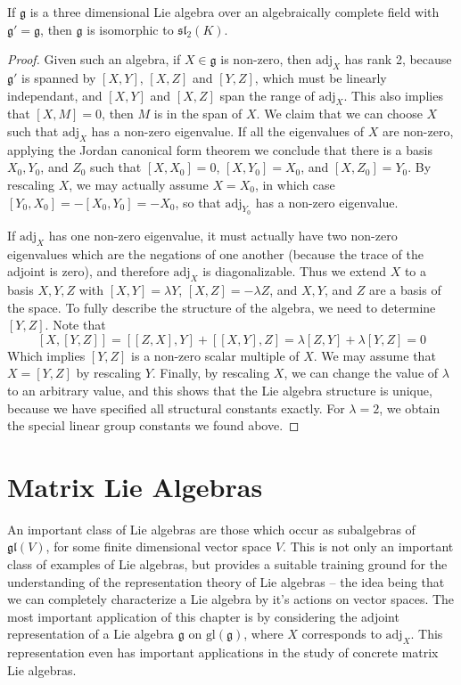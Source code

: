 \begin{theorem}
    If $\mathfrak{g}$ is a three dimensional Lie algebra over an algebraically complete field with $\mathfrak{g}' = \mathfrak{g}$, then $\mathfrak{g}$ is isomorphic to $\mathfrak{sl}_2(K)$.
\end{theorem}
\begin{proof}
Given such an algebra, if $X \in \mathfrak{g}$ is non-zero, then $\text{adj}_X$ has rank 2, because $\mathfrak{g}'$ is spanned by $[X,Y]$, $[X,Z]$ and $[Y,Z]$, which must be linearly independant, and $[X,Y]$ and $[X,Z]$ span the range of $\text{adj}_X$. This also implies that $[X,M] = 0$, then $M$ is in the span of $X$. We claim that we can choose $X$ such that $\text{adj}_X$ has a non-zero eigenvalue. If all the eigenvalues of $X$ are non-zero, applying the Jordan canonical form theorem we conclude that there is a basis $X_0, Y_0$, and $Z_0$ such that $[X,X_0] = 0$, $[X,Y_0] = X_0$, and $[X,Z_0] = Y_0$. By rescaling $X$, we may actually assume $X = X_0$, in which case $[Y_0,X_0] = -[X_0,Y_0] = -X_0$, so that $\text{adj}_{Y_0}$ has a non-zero eigenvalue.

If $\text{adj}_X$ has one non-zero eigenvalue, it must actually have two non-zero eigenvalues which are the negations of one another (because the trace of the adjoint is zero), and therefore $\text{adj}_X$ is diagonalizable. Thus we extend $X$ to a basis $X,Y,Z$ with $[X,Y] = \lambda Y$, $[X,Z] = -\lambda Z$, and $X,Y$, and $Z$ are a basis of the space. To fully describe the structure of the algebra, we need to determine $[Y,Z]$. Note that
%
\[ [X,[Y,Z]] = [[Z,X],Y] + [[X,Y],Z] = \lambda [Z,Y] + \lambda [Y,Z] = 0 \]
%
Which implies $[Y,Z]$ is a non-zero scalar multiple of $X$. We may assume that $X = [Y,Z]$ by rescaling $Y$. Finally, by rescaling $X$, we can change the value of $\lambda$ to an arbitrary value, and this shows that the Lie algebra structure is unique, because we have specified all structural constants exactly. For $\lambda = 2$, we obtain the special linear group constants we found above.
\end{proof}










\chapter{Matrix Lie Algebras}

An important class of Lie algebras are those which occur as subalgebras of $\mathfrak{gl}(V)$, for some finite dimensional vector space $V$. This is not only an important class of examples of Lie algebras, but provides a suitable training ground for the understanding of the representation theory of Lie algebras -- the idea being that we can completely characterize a Lie algebra by it's actions on vector spaces. The most important application of this chapter is by considering the adjoint representation of a Lie algebra $\mathfrak{g}$ on $\text{gl}(\mathfrak{g})$, where $X$ corresponds to $\text{adj}_X$. This representation even has important applications in the study of concrete matrix Lie algebras.

